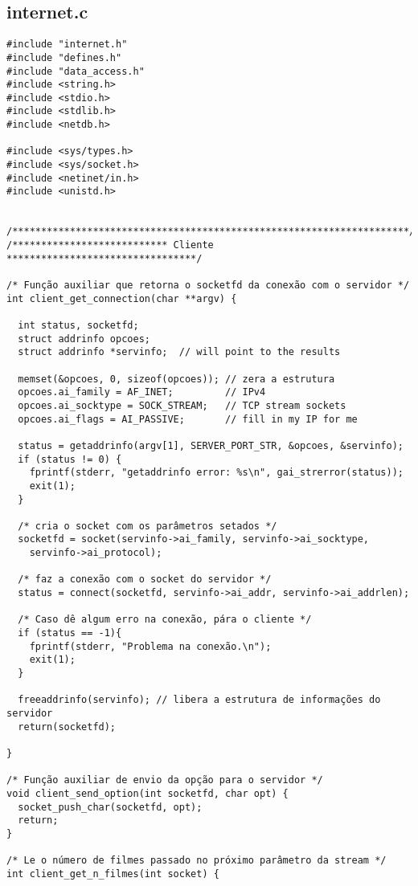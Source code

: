 \documentclass[11pt,twoside]{article}
\begin{document}
\subsection{internet.c}     %
\begin{verbatim}
#include "internet.h"
#include "defines.h"
#include "data_access.h"
#include <string.h>
#include <stdio.h>
#include <stdlib.h>
#include <netdb.h>

#include <sys/types.h>
#include <sys/socket.h>
#include <netinet/in.h>
#include <unistd.h>


/*********************************************************************/
/*************************** Cliente *********************************/

/* Função auxiliar que retorna o socketfd da conexão com o servidor */
int client_get_connection(char **argv) {

  int status, socketfd;
  struct addrinfo opcoes;
  struct addrinfo *servinfo;  // will point to the results

  memset(&opcoes, 0, sizeof(opcoes)); // zera a estrutura
  opcoes.ai_family = AF_INET;         // IPv4
  opcoes.ai_socktype = SOCK_STREAM;   // TCP stream sockets
  opcoes.ai_flags = AI_PASSIVE;       // fill in my IP for me

  status = getaddrinfo(argv[1], SERVER_PORT_STR, &opcoes, &servinfo);
  if (status != 0) {
    fprintf(stderr, "getaddrinfo error: %s\n", gai_strerror(status));
    exit(1);
  }

  /* cria o socket com os parâmetros setados */
  socketfd = socket(servinfo->ai_family, servinfo->ai_socktype,
    servinfo->ai_protocol);

  /* faz a conexão com o socket do servidor */
  status = connect(socketfd, servinfo->ai_addr, servinfo->ai_addrlen);

  /* Caso dê algum erro na conexão, pára o cliente */
  if (status == -1){
    fprintf(stderr, "Problema na conexão.\n");
    exit(1);
  }

  freeaddrinfo(servinfo); // libera a estrutura de informações do servidor
  return(socketfd);

}

/* Função auxiliar de envio da opção para o servidor */
void client_send_option(int socketfd, char opt) {
  socket_push_char(socketfd, opt);
  return;
}

/* Le o número de filmes passado no próximo parâmetro da stream */
int client_get_n_filmes(int socket) {


\end{verbatim}
\end{document}
